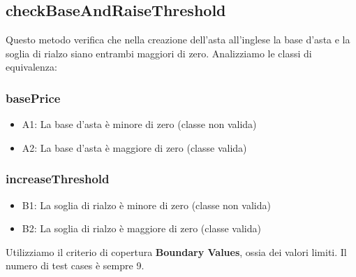 \subsection{checkBaseAndRaiseThreshold}

Questo metodo verifica che nella creazione dell'asta all'inglese la base d'asta e la soglia di rialzo siano entrambi maggiori di zero.\meskip
Analizziamo le classi di equivalenza:

\subsubsection*{basePrice}

\begin{itemize}
	\item A1: La base d'asta è minore di zero (classe non valida)
	\item A2: La base d'asta è maggiore di zero (classe valida)
\end{itemize}

\subsubsection*{increaseThreshold}

\begin{itemize}
	\item B1: La soglia di rialzo è minore di zero (classe non valida)
	\item B2: La soglia di rialzo è maggiore di zero (classe valida)
\end{itemize}\medskip

\noindent
Utilizziamo il criterio di copertura \textbf{Boundary Values}, ossia dei valori limiti. Il numero di test cases è sempre 9.

